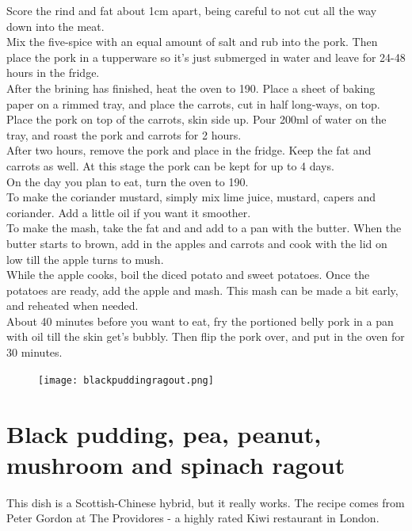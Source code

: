 \documentclass{tufte-book}
\begin{document}
\smallskip
Score the rind and fat about 1cm apart, being careful to not cut all the way down into the meat. 
\\Mix the five-spice with an equal amount of salt and rub into the pork. Then place the pork in a tupperware so it's just submerged in water and leave for 24-48 hours in the fridge.
\\After the brining has finished, heat the oven to 190\celsius. Place a sheet of baking paper on a rimmed tray, and place the carrots, cut in half long-ways, on top. 
\\Place the pork on top of the carrots, skin side up. Pour 200ml of water on the tray, and roast the pork and carrots for 2 hours. 
\\After two hours, remove the pork and place in the fridge. Keep the fat and carrots as well. At this stage the pork can be kept for up to 4 days.
\\On the day you plan to eat, turn the oven to 190\celsius. 
\\To make the coriander mustard, simply mix lime juice, mustard, capers and coriander. Add a little oil if you want it smoother. 
\\To make the mash, take the fat and and add to a pan with the butter. When the butter starts to brown, add in the apples and carrots and cook with the lid on low till the apple turns to mush. 
\\While the apple cooks, boil the diced potato and sweet potatoes. Once the potatoes are ready, add the apple and mash. This mash can be made a bit early, and reheated when needed. 
\\About 40 minutes before you want to eat, fry the portioned belly pork in a pan with oil till the skin get's bubbly. Then flip the pork over, and put in the oven for 30 minutes.


\begin{figure}[h]
  \texttt{[image: blackpuddingragout.png]}
\end{figure}

\section{Black pudding, pea, peanut, mushroom and spinach ragout}

This dish is a Scottish-Chinese hybrid, but it really works. The recipe comes from Peter Gordon at The Providores - a highly rated Kiwi restaurant in London.
\end{document}
